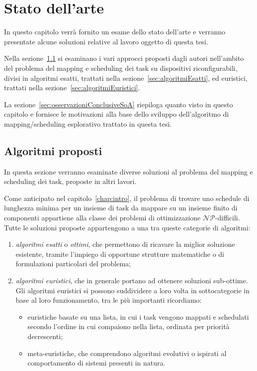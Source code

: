 \chapter{Stato dell'arte}
\label{chap:SOA}
\vspace{1cm}
In questo capitolo verrà fornito un esame dello stato dell'arte e verranno presentate 
alcune soluzioni relative al lavoro oggetto di questa tesi.

Nella sezione~\ref{sec:algoritmiProposti} si esaminano i vari approcci proposti 
dagli autori nell'ambito del problema del mapping e scheduling dei task su dispositivi 
riconfigurabili, divisi in algoritmi esatti, trattati nella
sezione~\ref{sec:algoritmiEsatti}, ed euristici, trattati nella
sezione~\ref{sec:algoritmiEuristici}.

La sezione~\ref{sec:osservazioniConclusiveSoA} riepiloga quanto visto in questo capitolo
e fornisce le motivazioni alla base dello sviluppo dell'algoritmo di mapping/scheduling
esplorativo trattato in questa tesi.

\newpage

\section{Algoritmi proposti}
\label{sec:algoritmiProposti}
In questa sezione verranno esaminate diverse soluzioni al problema del
mapping e scheduling dei task, proposte in altri lavori.

Come anticipato nel capitolo~\ref{chap:intro}, il problema di trovare uno 
schedule di lunghezza minima per un insieme di task da mappare su un insieme finito
di componenti appartiene alla classe dei problemi di ottimizzazione 
$\mathcal{NP}$-difficili. Tutte le soluzioni proposte appartengono a una 
tra queste categorie di algoritmi:
\begin{enumerate}
 \item \emph{algoritmi esatti} o \emph{ottimi}, che permettono di ricavare la 
miglior soluzione esistente, tramite l'impiego di opportune strutture matematiche o di 
formulazioni particolari del problema;
 \item \emph{algoritmi euristici}, che in generale portano ad ottenere 
soluzioni sub-ottime. Gli algoritmi euristici si possono suddividere a loro 
volta in sottocategorie in base al loro funzionamento, tra le più importanti 
ricordiamo:
 \begin{itemize}
  \item euristiche basate su una lista, in cui i task vengono mappati e schedulati 
secondo l'ordine in cui compaiono nella lista, ordinata per priorità decrescenti;
  \item meta-euristiche, che comprendono algoritmi evolutivi o ispirati al 
comportamento di sistemi presenti in natura.
 \end{itemize}
\end{enumerate}

